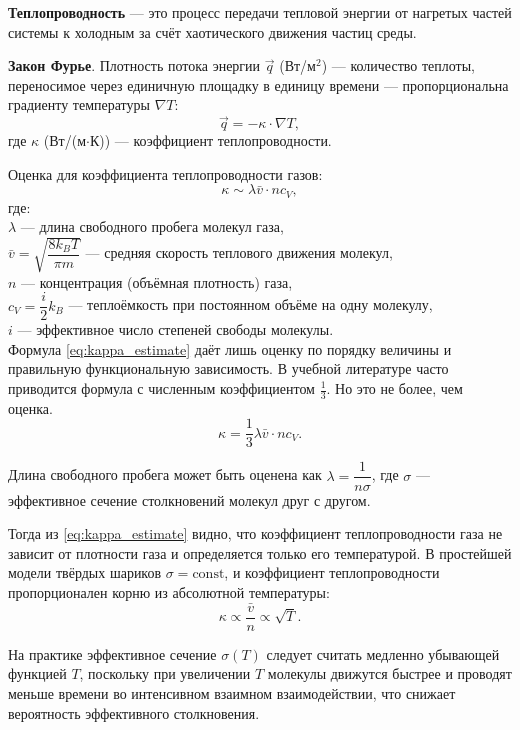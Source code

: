 \documentclass[a4paper,12pt]{article} %
\begin{document}
\textbf{Теплопроводность} — это процесс передачи тепловой энергии от нагретых частей системы к холодным за счёт хаотического движения частиц среды. 

\textbf{Закон Фурье}. Плотность потока энергии $\vec{q}$ (Вт/м$^2$) — количество теплоты, переносимое через единичную площадку в единицу времени — пропорциональна градиенту температуры $\nabla T$:
\begin{equation}
    \vec{q} = -\kappa \cdot \nabla T, \label{eq:fourier}
\end{equation}
где $\kappa$ (Вт/(м$\cdot$К)) — коэффициент теплопроводности.

Оценка для коэффициента теплопроводности газов:
\begin{equation}
    \kappa \sim \lambda \bar{v} \cdot n c_V, \label{eq:kappa_estimate}
\end{equation}
где:\\ 
$\lambda$ — длина свободного пробега молекул газа,\\
$\bar{v} = \sqrt{\dfrac{8k_B T}{\pi m}}$ — средняя скорость теплового движения молекул, \\
$n$ — концентрация (объёмная плотность) газа, \\
$c_V = \dfrac{i}{2}k_B$ — теплоёмкость при постоянном объёме на одну молекулу, \\
$i$ — эффективное число степеней свободы молекулы. \\

Формула \eqref{eq:kappa_estimate} даёт лишь оценку по порядку величины и правильную функциональную зависимость. В учебной литературе часто приводится формула с численным коэффициентом $\frac{1}{3}$. Но это не более, чем оценка. 
\[
    \kappa = \frac{1}{3} \lambda \bar{v} \cdot n c_V.
\]

Длина свободного пробега может быть оценена как $\lambda = \dfrac{1}{n \sigma}$, где $\sigma$ — эффективное сечение столкновений молекул друг с другом.

Тогда из \eqref{eq:kappa_estimate} видно, что коэффициент теплопроводности газа не зависит от плотности газа и определяется только его температурой. В простейшей модели твёрдых шариков $\sigma = \text{const}$, и коэффициент теплопроводности пропорционален корню из абсолютной температуры:
\[
    \kappa \propto \frac{\bar{v}}{n} \propto \sqrt{T}.
\]

На практике эффективное сечение $\sigma(T)$ следует считать медленно убывающей функцией $T$, поскольку при увеличении $T$ молекулы движутся быстрее и проводят меньше времени во интенсивном взаимном взаимодействии, что снижает вероятность эффективного столкновения.
\end{document}
